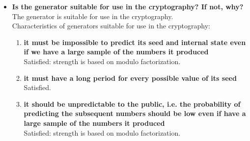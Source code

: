 \documentclass[a4paper,10pt]{article}
\begin{document}
\begin{itemize}
 \item \textbf{Is the generator suitable for use in the cryptography? If not, why?} \\
  The generator is suitable for use in the cryptography.\\
 Characteristics of generators suitable for use in the cryptography:
  \begin{enumerate}
   \item \textbf{it must be impossible to predict its seed and internal state even if we have a large sample of the numbers it produced} \\
   Satisfied: strength is based on modulo factorization.
   \item \textbf{it must have a long period for every possible value of its seed} \\
   Satisfied.
   \item \textbf{it should be unpredictable to the public, i.e. the probability of predicting the subsequent numbers should be low even if have a large sample of the numbers it produced} \\
   Satisfied: strength is based on modulo factorization.
   \end{enumerate}

\end{itemize}
\end{document}
